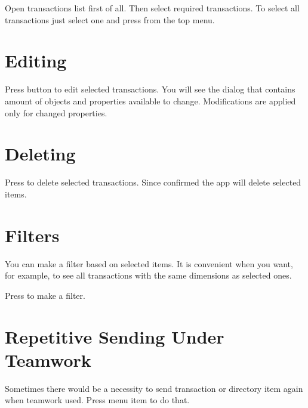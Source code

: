 \documentclass[a4paper,10pt,english]{sphinxmanual}
\begin{document}
Open transactions list first of all. Then select required transactions.
To select all transactions just select one and press  from the top menu.


\section{Editing}
\label{\detokenize{bulk-actions:editing}}
Press  button to edit selected transactions. You will see the dialog that
contains amount of objects and properties available to change. Modifications are applied
only for changed properties.

\noindent{}

\noindent{}


\section{Deleting}
\label{\detokenize{bulk-actions:deleting}}
Press  to delete selected transactions. Since confirmed the app will delete
selected items.

\noindent{}

\noindent{}


\section{Filters}
\label{\detokenize{bulk-actions:filters}}
You can make a filter based on selected items. It is convenient when you want, for example,
to see all transactions with the same dimensions as selected ones.

Press  to make a filter.

\noindent{}

\noindent{}


\section{Repetitive Sending Under Teamwork}
\label{\detokenize{bulk-actions:repetitive-sending-under-teamwork}}
Sometimes there would be a necessity to send transaction or directory item again when teamwork used.
Press  menu item to do that.
\end{document}
